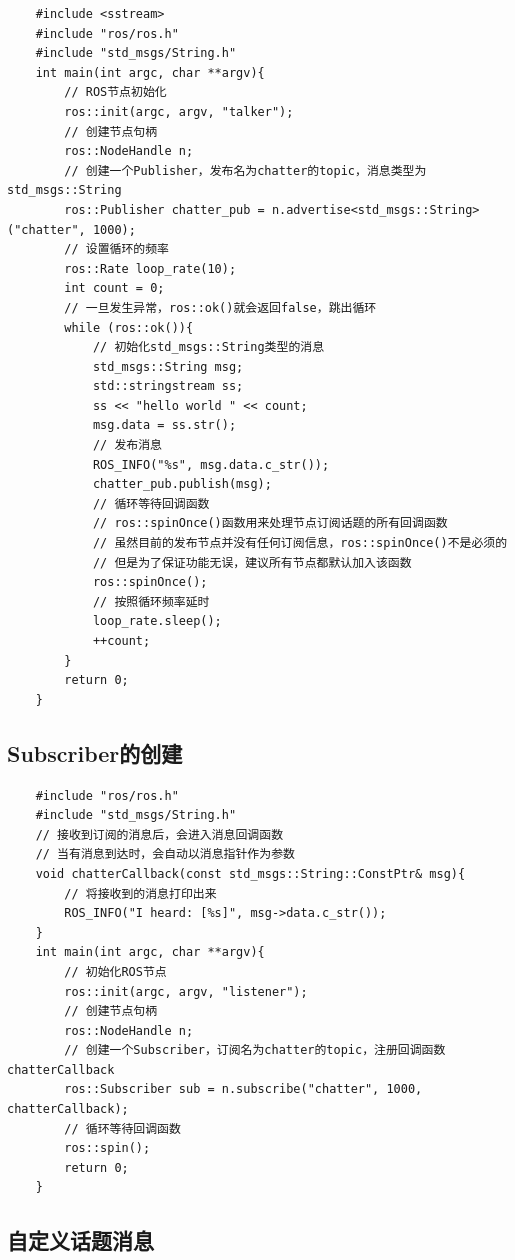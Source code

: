 \documentclass[9pt, oneside]{book}
\begin{document}
\begin{verbatim}
    #include <sstream>
    #include "ros/ros.h"
    #include "std_msgs/String.h"
    int main(int argc, char **argv){
        // ROS节点初始化
        ros::init(argc, argv, "talker");
        // 创建节点句柄
        ros::NodeHandle n;
        // 创建一个Publisher，发布名为chatter的topic，消息类型为std_msgs::String
        ros::Publisher chatter_pub = n.advertise<std_msgs::String>("chatter", 1000);
        // 设置循环的频率
        ros::Rate loop_rate(10);
        int count = 0;
        // 一旦发生异常，ros::ok()就会返回false，跳出循环
        while (ros::ok()){
            // 初始化std_msgs::String类型的消息
            std_msgs::String msg;
            std::stringstream ss;
            ss << "hello world " << count;
            msg.data = ss.str();
            // 发布消息
            ROS_INFO("%s", msg.data.c_str());
            chatter_pub.publish(msg);
            // 循环等待回调函数
            // ros::spinOnce()函数用来处理节点订阅话题的所有回调函数
            // 虽然目前的发布节点并没有任何订阅信息，ros::spinOnce()不是必须的
            // 但是为了保证功能无误，建议所有节点都默认加入该函数
            ros::spinOnce();
            // 按照循环频率延时
            loop_rate.sleep();
            ++count;
        }
        return 0;
    }
\end{verbatim}

\subsection{Subscriber的创建}

\begin{verbatim}
    #include "ros/ros.h"
    #include "std_msgs/String.h"
    // 接收到订阅的消息后，会进入消息回调函数
    // 当有消息到达时，会自动以消息指针作为参数
    void chatterCallback(const std_msgs::String::ConstPtr& msg){
        // 将接收到的消息打印出来
        ROS_INFO("I heard: [%s]", msg->data.c_str());
    }
    int main(int argc, char **argv){
        // 初始化ROS节点
        ros::init(argc, argv, "listener");
        // 创建节点句柄
        ros::NodeHandle n;
        // 创建一个Subscriber，订阅名为chatter的topic，注册回调函数chatterCallback
        ros::Subscriber sub = n.subscribe("chatter", 1000, chatterCallback);
        // 循环等待回调函数
        ros::spin();
        return 0;
    }
\end{verbatim}

\subsection{自定义话题消息}
\end{document}
